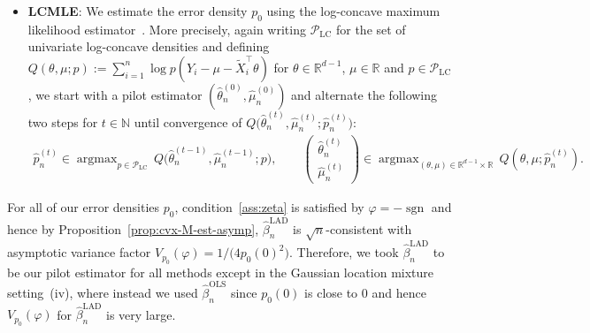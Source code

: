 \documentclass[a4paper]{article}
\newcommand{\N}{\mathbb{N}}
\newcommand{\R}{\mathbb{R}}
\DeclareMathOperator{\sgn}{sgn}
\DeclareMathOperator*{\argmax}{argmax}
\theoremstyle{definition}
\newcommand{\red}[1]{{\color{red!90!black}#1}}
\begin{document}
\begin{itemize}
\item \textbf{LCMLE}: We estimate the error density $p_0$ using the log-concave maximum likelihood estimator~\citep{cule2010maximum,dumbgen2011approximation,dumbgen2013stochastic}. More precisely, again writing $\mathcal{P}_{\mathrm{LC}}$ for the set of univariate log-concave densities and defining $Q(\theta,\mu; p) := \sum_{i=1}^n \log p(Y_i - \mu - \tilde{X}_i^\top\theta)$ for $\theta \in \R^{d-1}$, $\mu \in \R$ and $p \in \mathcal{P}_{\mathrm{LC}}$, we start with a pilot estimator $(\hat{\theta}_n^{(0)},\hat{\mu}_n^{(0)})$ and alternate the following two steps for $t \in \N$ until convergence of $Q\bigl(\hat{\theta}_n^{(t)},\hat{\mu}_n^{(t)};\hat{p}_n^{(t)}\bigr)$:
\begin{align*}
\hat{p}_n^{(t)} \in \argmax_{p \in \mathcal{P}_{\mathrm{LC}}}\,Q\bigl(\hat{\theta}_n^{(t-1)},\hat{\mu}_n^{(t-1)}; p\bigr), \qquad
\begin{pmatrix} \hat{\theta}_n^{(t)} \\ \hat{\mu}_n^{(t)} \end{pmatrix} \in \argmax_{(\theta, \mu) \in \R^{d-1} \times \R}\,Q(\theta,\mu;\hat{p}_n^{(t)}).
\end{align*}
\end{itemize}

For all of our error densities $p_0$, condition~\ref{ass:zeta} is satisfied by $\varphi = -\sgn$ and hence by Proposition~\ref{prop:cvx-M-est-asymp}, $\hat{\beta}_n^{\mathrm{LAD}}$ is $\sqrt{n}$-consistent with asymptotic variance factor $V_{p_0}(\varphi) = 1/\bigl(4p_0(0)^2\bigr)$. Therefore, we took $\hat{\beta}_n^{\mathrm{LAD}}$ to be our pilot estimator for all methods except in the Gaussian location mixture setting~(iv), where instead we used $\hat{\beta}_n^{\mathrm{OLS}}$ since $p_0(0)$ is close to 0 and hence $V_{p_0}(\varphi)$ for $\hat{\beta}_n^{\mathrm{LAD}}$ is very large.
\end{document}
